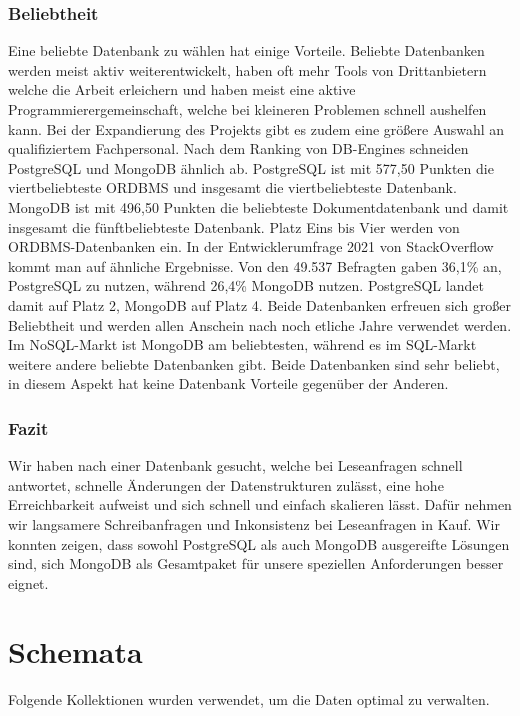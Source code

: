 \subsubsection{Beliebtheit}
Eine beliebte Datenbank zu wählen hat einige Vorteile. Beliebte Datenbanken werden meist aktiv weiterentwickelt, haben oft mehr Tools von Drittanbietern welche die Arbeit erleichern und haben meist eine aktive Programmierergemeinschaft, welche bei kleineren Problemen schnell aushelfen kann. Bei der Expandierung des Projekts gibt es zudem eine größere Auswahl an qualifiziertem Fachpersonal.
Nach dem Ranking von DB-Engines schneiden PostgreSQL und MongoDB ähnlich ab. PostgreSQL ist mit 577,50 Punkten die viertbeliebteste ORDBMS und insgesamt die viertbeliebteste Datenbank. MongoDB ist mit 496,50 Punkten die beliebteste Dokumentdatenbank und damit insgesamt die fünftbeliebteste Datenbank. Platz Eins bis Vier werden von ORDBMS-Datenbanken ein. \cite{DB4}
In der Entwicklerumfrage 2021 von StackOverflow kommt man auf ähnliche Ergebnisse. Von den 49.537 Befragten gaben 36,1\% an, PostgreSQL zu nutzen, während 26,4\% MongoDB nutzen. PostgreSQL landet damit auf Platz 2, MongoDB auf Platz 4. \cite{DB5}
Beide Datenbanken erfreuen sich großer Beliebtheit und werden allen Anschein nach noch etliche Jahre verwendet werden. Im NoSQL-Markt ist MongoDB am beliebtesten, während es im SQL-Markt weitere andere beliebte Datenbanken gibt. Beide Datenbanken sind sehr beliebt, in diesem Aspekt hat keine Datenbank Vorteile gegenüber der Anderen.

\subsubsection{Fazit}
Wir haben nach einer Datenbank gesucht, welche bei Leseanfragen schnell antwortet, schnelle Änderungen der Datenstrukturen zulässt, eine hohe Erreichbarkeit aufweist und sich schnell und einfach skalieren lässt. Dafür nehmen wir langsamere Schreibanfragen und Inkonsistenz bei Leseanfragen in Kauf. Wir konnten zeigen, dass sowohl PostgreSQL als auch MongoDB ausgereifte Lösungen sind, sich MongoDB als Gesamtpaket für unsere speziellen Anforderungen besser eignet.

\section{Schemata}
Folgende Kollektionen wurden verwendet, um die Daten optimal zu verwalten.

